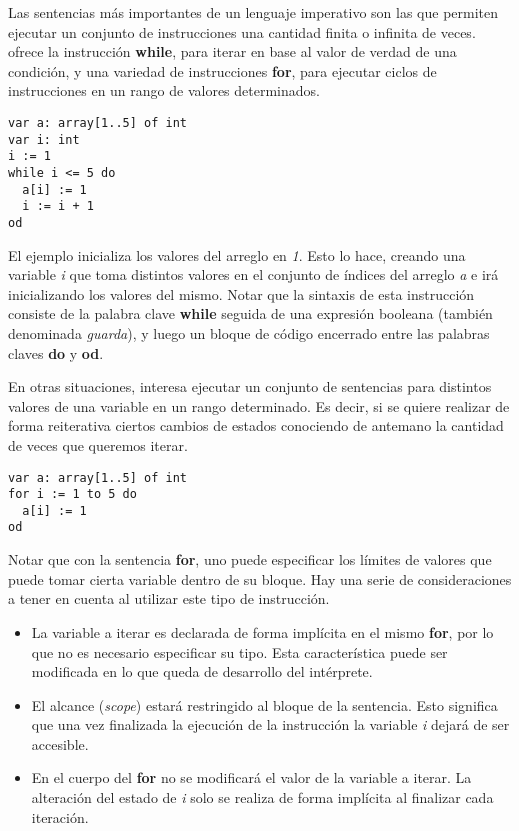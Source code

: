 \documentclass{article}
\begin{document}
Las sentencias más importantes de un lenguaje imperativo son las que permiten ejecutar un conjunto de instrucciones una cantidad finita o infinita de veces.
\Lang\space ofrece la instrucción \textbf{while}, para iterar en base al valor de verdad de una condición, y una variedad de instrucciones \textbf{for}, para ejecutar ciclos de instrucciones en un rango de valores determinados.
\begin{lstlisting}
var a: array[1..5] of int
var i: int
i := 1
while i <= 5 do
  a[i] := 1
  i := i + 1
od
\end{lstlisting}

El ejemplo inicializa los valores del arreglo en \textit{1}.
Esto lo hace, creando una variable \textit{i} que toma distintos valores en el conjunto de índices del arreglo \textit{a} e irá inicializando los valores del mismo.
Notar que la sintaxis de esta instrucción consiste de la palabra clave \textbf{while} seguida de una expresión booleana (también denominada \textit{guarda}), y luego un bloque de código encerrado entre las palabras claves \textbf{do} y \textbf{od}.

En otras situaciones, interesa ejecutar un conjunto de sentencias para distintos valores de una variable en un rango determinado.
Es decir, si se quiere realizar de forma reiterativa ciertos cambios de estados conociendo de antemano la cantidad de veces que queremos iterar.
\begin{lstlisting}
var a: array[1..5] of int
for i := 1 to 5 do
  a[i] := 1
od
\end{lstlisting}

Notar que con la sentencia \textbf{for}, uno puede especificar los límites de valores que puede tomar cierta variable dentro de su bloque.
Hay una serie de consideraciones a tener en cuenta al utilizar este tipo de instrucción.

\begin{itemize}

\item
La variable a iterar es declarada de forma implícita en el mismo \textbf{for}, por lo que no es necesario especificar su tipo.
Esta característica puede ser modificada en lo que queda de desarrollo del intérprete.

\item
El alcance (\textit{scope}) estará restringido al bloque de la sentencia.
Esto significa que una vez finalizada la ejecución de la instrucción la variable \textit{i} dejará de ser accesible.

\item
En el cuerpo del \textbf{for} no se modificará el valor de la variable a iterar.
La alteración del estado de \textit{i} solo se realiza de forma implícita al finalizar cada iteración.

\end{itemize}
\end{document}
